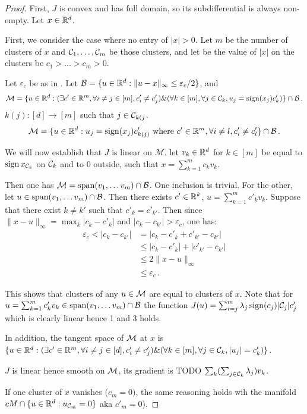 \begin{proof}
  First, $J$ is convex and has full domain, so its subdifferential is always non-empty.
  Let $x \in \mathbb{R}^d$.

  First, we consider the case where no entry of $\lvert x\rvert >0$.
  Let $m$ be the number of clusters of $x$ and $\mathcal{C}_1, \ldots, \mathcal{C}_m$ be those clusters, and let be the  value of  $\lvert x \rvert$ on the clusters be $c_1 > \ldots > c_m > 0$.

  Let $\varepsilon_c$ be as in .
  Let $\mathcal{B} = \{u \in \mathbb{R}^d: \lVert u - x \rVert_\infty \leq \varepsilon_c / 2\}$,
  and
  \begin{equation}
    \mathcal{M} = \{ u \in \mathbb{R}^d : (\exists c' \in \mathbb{R}^m, \forall i \neq j \in [m], c'_i \neq c'_j) \& (\forall k \in [m], \forall j \in \mathcal{C}_k, u_j = \operatorname{sign}(x_j) c'_k) \} \cap \mathcal{B} \, .
  \end{equation}
  $k(j):[d] \rightarrow [m]$  such that $j \in \mathcal{C}_{k(j}$.
 \begin{equation}
    \mathcal{M} = \{ u \in \mathbb{R}^d : u_j = \operatorname{sign}(x_j) c'_{k(j)}\mbox{ where }  c' \in \mathbb{R}^m, \forall i \neq l , c'_i \neq c'_l \} \cap \mathcal{B} \, .
  \end{equation}

We will now establish that $J$ is linear on $\mathcal{M}$. 
  let $v_k \in \mathbb{R}^d$ for $k \in [m]$  be equal to $\operatorname{sign} x_{\mathcal{C}_k}$ on $\mathcal{C}_k$ and to 0 outside, such that $x = \sum_{k=1}^m c_k v_k$.


  Then one has $\mathcal{M} = \operatorname{span}(v_1, \ldots v_m) \cap \mathcal{B}$.
  One inclusion is trivial.
  For the other, let $u \in \operatorname{span}(v_1, \ldots v_m) \cap \mathcal{B}$.
  Then there exists $c' \in \mathbb{R}^k$, $u = \sum_{k=1}^m c'_k v_k$.
  Suppose that there exist $k \neq k'$ such that $c'_k = c'_{k'}$.
  Then since $\lVert x - u \rVert_\infty = \max_k |c_k - c'_k|$ and $|c_k - c_{k'}| > \varepsilon_c$, one has:
  \begin{align*}
     \varepsilon_c < |c_k - c_{k'}|
     &= |c_k - c'_k + c'_{k'} - c_{k'}| \\
     &\leq |c_k - c'_k| + |c'_{k'} - c_{k'}| \\
     &\leq 2 \lVert x - u \rVert_\infty \\
     &\leq  \varepsilon_c \, .
  \end{align*}

  This shows that clusters of any $u \in \mathcal{M}$ are equal to clusters of $x$.
  Note that for $u =\sum_{k=1}^m c'_k v_k\in \operatorname{span}(v_1, \ldots v_m) \cap \mathcal{B}$ the function $J(u) = \sum_{i=j}^m \lambda_j \operatorname{sign}(c_j) |\mathcal{C}_j|c_j'$ which is clearly linear hence 1 and 3 holds.

  
  In addition, the tangent space of $\mathcal{M}$ at $x$ is $\{ u \in \mathbb{R}^d : (\exists c' \in \mathbb{R}^m, \forall i \neq j \in [d], c'_i \neq c'_j) \& (\forall k \in [m], \forall j \in \mathcal{C}_k, |u_j| = c'_k) \}$.

  $J$ is linear hence smooth on $\mathcal{M}$, its gradient is TODO $\sum_k (\sum_{j \in \mathcal{C}_k} \lambda_j) v_k$. 

  If one cluster of $x$ vanishes ($c_m = 0)$, the same reasoning holds wih the manifold $cM \cap \{u \in \mathbb{R}^d: u_{\mathcal{C}_m} = 0\}$ aka $c'_m = 0$).
\end{proof}